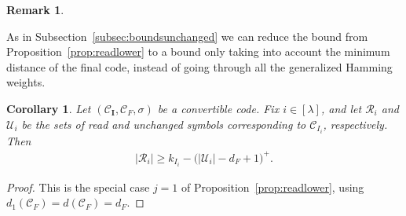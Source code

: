 \documentclass[conference, 10pt]{IEEEtran}
\theoremstyle{plain}
\newtheorem{corollary}[theorem]{Corollary}
\theoremstyle{definition}
\newtheorem{remark}[definition]{Remark}
\newcommand{\mC}{\mathcal{C}}
\newcommand{\mU}{\mathcal{U}}
\newcommand{\mR}{\mathcal{R}}
\begin{document}
\begin{remark}



\end{remark}
As in Subsection~\ref{subsec:boundsunchanged} we can reduce the bound from Proposition~\ref{prop:readlower} to a bound only taking into account the minimum distance of the final code, instead of going through all the generalized Hamming weights.

\begin{corollary}\label{cor:readloweru}
Let $(\mC_{\textbf{I}},\mC_F,\sigma)$ be a convertible code. Fix $i\in [\lambda]$, and let $\mR_i$ and $\mU_i$ be the sets of read and unchanged symbols corresponding to $\mC_{I_i}$, respectively. Then
\begin{align*} |\mR_i|\ge k_{I_i}-\bigl(|\mU_i|-d_F+1\bigr)^+. \end{align*}
\end{corollary}

\begin{proof}
This is the special case $j=1$ of Proposition~\ref{prop:readlower}, using $d_1(\mC_F)=d(\mC_F)=d_F$.
\end{proof}
\end{document}
